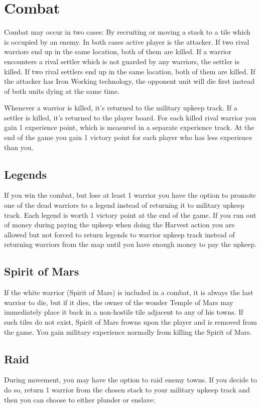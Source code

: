 \documentclass[11pt,a4paper,titlepage]{article}
\begin{document}
\section{Combat}{
  Combat may occur in two cases: By recruiting or moving a stack to a tile
  which is occupied by an enemy. In both cases active player is the attacker.
  If two rival warriors end up in the same location, both of them are killed.
  If a warrior encounters a rival settler which is not guarded by any warriors,
  the settler is killed. If two rival settlers end up in the same location,
  both of them are killed. If the attacker has Iron Working technology, the
  opponent unit will die first instead of both units dying at the same time.

  Whenever a warrior is killed, it's returned to the military upkeep track.
  If a settler is killed, it's returned to the player board. For each killed
  rival warrior you gain 1 experience point, which is measured in a separate
  experience track. At the end of the game you gain 1 victory point for each
  player who has less experience than you.

  \subsection{Legends}{
    If you win the combat, but lose at least 1 warrior you have the option to
    promote one of the dead warriors to a legend instead of returning it to
    military upkeep track. Each legend is worth 1 victory point at the end of
    the game. If you run out of money during paying the upkeep when doing the
    Harvest action you are allowed but not forced to return legends to warrior
    upkeep track instead of returning warriors from the map until you have
    enough money to pay the upkeep.
  }\label{subsec:legends}

  \subsection{Spirit of Mars}{
    If the white warrior (Spirit of Mars) is included in a combat, it is always
    the last warrior to die, but if it dies, the owner of the wonder Temple of
    Mars may immediately place it back in a non-hostile tile adjacent to any
    of his towns. If such tiles do not exist, Spirit of Mars frowns upon the
    player and is removed from the game. You gain military experience normally
    from killing the Spirit of Mars.
  }\label{subsec:spirit_of_mars}
  
  \subsection{Raid}{
    During movement, you may have the option to raid enemy towns. If you
    decide to do so, return 1 warrior from the chosen stack to your military
    upkeep track and then you can choose to either plunder or enslave:

}}
\end{document}

